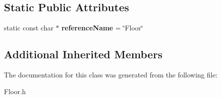 \subsection*{Static Public Attributes}
\begin{DoxyCompactItemize}
\item 
\hypertarget{class_arena_1_1_floor_aada3ca48ff67e2547274b0ddefe7db82}{static const char $\ast$ {\bfseries reference\+Name} = \char`\"{}Floor\char`\"{}}\label{class_arena_1_1_floor_aada3ca48ff67e2547274b0ddefe7db82}

\end{DoxyCompactItemize}
\subsection*{Additional Inherited Members}


The documentation for this class was generated from the following file\+:\begin{DoxyCompactItemize}
\item 
Floor.\+h\end{DoxyCompactItemize}
